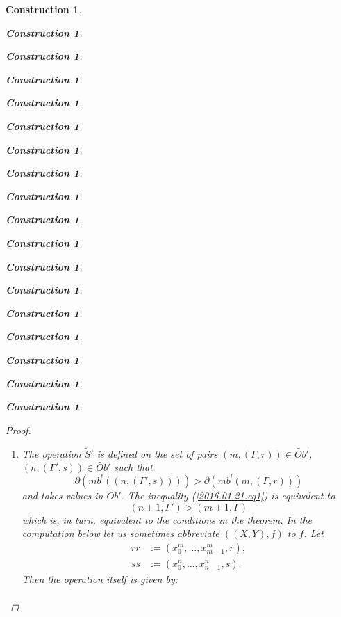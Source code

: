 \documentclass[onecolumn,12pt]{amsart}
\numberwithin{proposition}{subsection}
\newtheorem{construction}[proposition]{Construction}
\newcommand{\wt}{\widetilde}
\newcommand{\wh}{\widehat}
\newcommand{\spc}{{\,\,\,\,\,\,\,}}
\begin{document}
\begin{construction}
\begin{construction}
\begin{construction}
\begin{construction}
\begin{construction}
\begin{construction}
\begin{construction}
\begin{construction}
\begin{construction}
\begin{construction}
\begin{construction}
\begin{construction}
\begin{construction}
\begin{construction}
\begin{construction}
\begin{construction}
\begin{construction}
\begin{construction}
\begin{proof}
\begin{enumerate}
where $A=(m+1,\Gamma)$, $B=(n,\Gamma')$ and $i=n-m-1$. To apply Lemma
\ref{2016.01.31.l1} we should take $X=\wh{m}$, $l(X)=m$ and $Y=\wh{n}$, $l(Y)=n$,
and $$f=((ft(A),A),(x^{m}_0,\dots,x^{m}_{m-1},r)).$$  Let further
$rr=(x^{m}_0,\dots,x^{m}_{m-1},r)$. Then we can extend these equalities as
follows.
%
\begin{equation*}
  \begin{split}
    f^*&((n,\Gamma'),i)
    \\&=
    (rr^*(\wh{n},i),(T_0,\dots,T_{m-1},
    \\& \spc\spc\spc\spc
    q(rr,ft^i(\wh{n}),0)(T'_{m+1}),\dots,q(rr,ft(\wh{n}),i-1)(T'_{n-1})))
    \\&=
    (n-1,(T_0,\dots,T_{m-1},
    \\& \spc\spc\spc\spc
    rr(T'_{m+1}),\dots,qq^{n-m-2}(rr)(T'_{n-1})))
    \\&=
    (n-1,(T_0',\dots,T_{m-1}',
    \\& \spc\spc\spc\spc
    rr(T_{m+1}'),qq(rr)(T_{m+2}'),\dots,qq^{n-m-2}(rr)(T_{n-1}'))),
  \end{split}
\end{equation*}
%
where the last equality holds by the assumption that $T_i=T_i'$ for $i=0,\dots,m$. 
The required formula follows from the equality 
%
$$qq^j(rr)(T_{m+j+1}')=\theta_{m,m+j+1}(r,T_{m+j+1}').$$
%
\item The operation $\wt{S}'$ is defined on the set of pairs $(m,(\Gamma,r))\in \wt{Ob}'$, $(n,(\Gamma',s))\in \wt{Ob}'$ such that 
%
\begin{equation}\label{2016.01.21.eq1}
\partial(mb^!((n,(\Gamma',s))))>\partial(mb^!(m,(\Gamma,r)))
\end{equation}%
%
and takes values in $\wt{Ob}'$. The inequality (\ref{2016.01.21.eq1}) is equivalent to 
%
$$(n+1,\Gamma')>(m+1,\Gamma)$$
%
which is, in turn, equivalent to the conditions in the theorem. In the computation  below let us sometimes abbreviate $((X,Y),f)$ to $f$. Let
%
\begin{equation*}
  \begin{split}
    rr&:=(x_0^m,\dots,x_{m-1}^m,r),\\
    ss&:=(x_0^n,\dots,x_{n-1}^n,s).
  \end{split}
\end{equation*}
%
Then the operation itself is given by:
\begin{equation*}
  \begin{split}

\end{split}
\end{equation*}
\end{enumerate}
\end{proof}
\end{construction}
\end{construction}
\end{construction}
\end{construction}
\end{construction}
\end{construction}
\end{construction}
\end{construction}
\end{construction}
\end{construction}
\end{construction}
\end{construction}
\end{construction}
\end{construction}
\end{construction}
\end{construction}
\end{construction}
\end{construction}
\end{document}
